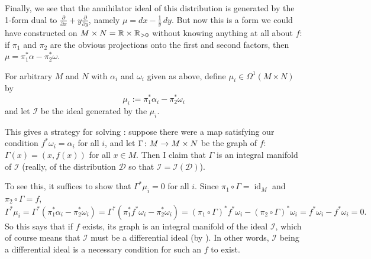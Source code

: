 \begin{example}
	Finally, we see that the annihilator ideal of this distribution is generated by the 1-form dual to $\frac{\partial}{\partial x} + y \frac{\partial}{\partial y}$, namely $\mu = dx - \frac{1}{y} \, dy$. But now this is a form we could have constructed on $M \times N = \mathbb{R} \times \mathbb{R}_{>0}$ without knowing anything at all about $f$: if $\pi_1$ and $\pi_2$ are the obvious projections onto the first and second factors, then $\mu = \pi_1^\ast \alpha - \pi_2^\ast \omega$.
\end{example}

For arbitrary $M$ and $N$ with $\alpha_i$ and $\omega_i$ given as above, define $\mu_i \in \Omega^1(M \times N)$ by 
\[
	\mu_i := \pi_1^\ast \alpha_i - \pi_2^\ast \omega_i
\]
and let $\mathcal{I}$ be the ideal generated by the $\mu_i$. 

This gives a strategy for solving : suppose there were a map satisfying our condition $f^\ast \omega_i = \alpha_i$ for all $i$, and let $\Gamma \colon\thinspace\! M \to M \times N$ be the graph of $f$: $\Gamma(x) = (x,f(x))$ for all $x \in M$. Then I claim that $\Gamma$ is an integral manifold of $\mathcal{I}$ (really, of the distribution $\mathcal{D}$ so that $\mathcal{I} = \mathcal{I}(\mathcal{D})$).

To see this, it suffices to show that $\Gamma^\ast \mu_i = 0$ for all $i$. Since $\pi_1 \circ \Gamma = \operatorname{id}_M$ and $\pi_2 \circ \Gamma = f$,
\[
	\Gamma^\ast \mu_i = \Gamma^\ast(\pi_1^\ast \alpha_i - \pi_2^\ast \omega_i) = \Gamma^\ast(\pi_1^\ast f^\ast \omega_i - \pi_2^\ast \omega_i)  = (\pi_1 \circ \Gamma)^\ast f^\ast \omega_i - (\pi_2 \circ \Gamma)^\ast \omega_i = f^\ast \omega_i - f^\ast \omega_i = 0.
\]
So this says that if $f$ exists, its graph is an integral manifold of the ideal $\mathcal{I}$, which of course means that $\mathcal{I}$ must be a differential ideal (by ). In other words, $\mathcal{I}$  being a differential ideal is a necessary condition for such an $f$ to exist.